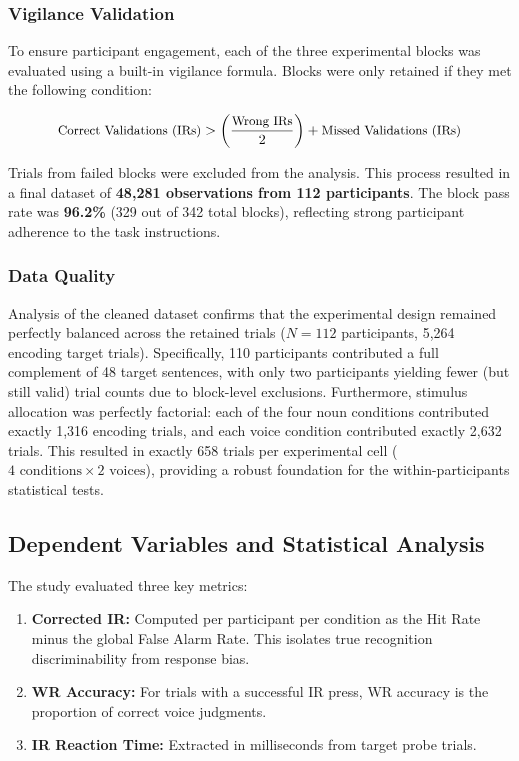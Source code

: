 \documentclass[12pt, a4paper]{article}
\begin{document}
\subsubsection{Vigilance Validation}

To ensure participant engagement, each of the three experimental blocks was evaluated using a built-in vigilance formula. Blocks were only retained if they met the following condition:

\begin{equation*}
  \small
  \text{Correct Validations (IRs)} > \left(\frac{\text{Wrong IRs}}{2}\right) + \text{Missed Validations (IRs)}
\end{equation*}

Trials from failed blocks were excluded from the analysis. This process resulted in a final dataset of \textbf{48,281 observations from 112 participants}. The block pass rate was \textbf{96.2\%} (329 out of 342 total blocks), reflecting strong participant adherence to the task instructions.

\subsubsection{Data Quality}

Analysis of the cleaned dataset confirms that the experimental design remained perfectly balanced across the retained trials ($N=112$ participants, 5,264 encoding target trials). Specifically, 110 participants contributed a full complement of 48 target sentences, with only two participants yielding fewer (but still valid) trial counts due to block-level exclusions. Furthermore, stimulus allocation was perfectly factorial: each of the four noun conditions contributed exactly 1,316 encoding trials, and each voice condition contributed exactly 2,632 trials. This resulted in exactly 658 trials per experimental cell ($4 \text{ conditions} \times 2 \text{ voices}$), providing a robust foundation for the within-participants statistical tests.


\subsection{Dependent Variables and Statistical Analysis}

The study evaluated three key metrics:
\begin{enumerate}
    \item \textbf{Corrected IR:} Computed per participant per condition as the Hit Rate minus the global False Alarm Rate. This isolates true recognition discriminability from response bias.
    \item \textbf{WR Accuracy:} For trials with a successful IR press, WR accuracy is the proportion of correct voice judgments.
    \item \textbf{IR Reaction Time:} Extracted in milliseconds from target probe trials.
\end{enumerate}
\end{document}
